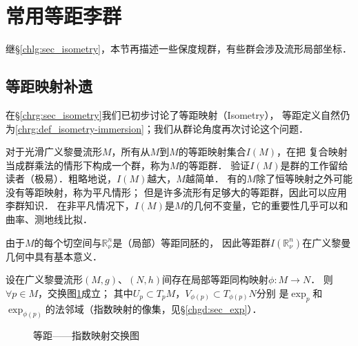 \section{常用等距李群}\label{chlg:sec_matrixG-II}
继\S\ref{chlg:sec_isometry}，本节再描述一些保度规群\cite{tung-1985}，有些群会涉及流形局部坐标．


\subsection{等距映射补遗}\label{chlg:sec_iso-add}
在\S \ref{chrg:sec_isometry}我们已初步讨论了等距映射（Isometry），
等距定义自然仍为\ref{chrg:def_isometry-immersion}；我们从群论角度再次讨论这个问题．


对于光滑广义黎曼流形$M$，所有从$M$到$M$的等距映射集合$I(M)$，在把
复合映射当成群乘法的情形下构成一个群，称为$M$的{\heiti 等距群}．
验证$I(M)$是群的工作留给读者（极易）．粗略地说，$I(M)$越大，$M$越简单．
有的$M$除了恒等映射之外可能没有等距映射，称为平凡情形；
但是许多流形有足够大的等距群，因此可以应用李群知识．
在非平凡情况下，$I(M)$是$M$的几何不变量，它的重要性几乎可以和曲率、测地线比拟．

由于$M$的每个切空间与$\mathbb{R}^n_\nu$是（局部）等距同胚的，
因此等距群$I(\mathbb{R}^n_\nu)$在广义黎曼几何中具有基本意义．

\begin{theorem}\label{chlg:thm_isoexp}
    设在广义黎曼流形$(M,g)$、$(N,h)$间存在局部等距同构映射$\phi:M\to N$．
    则$\forall p\in M$，交换图\ref{chlg:pic_exp-exchange}成立；
    其中$U_p\subset T_pM$，$V_{\phi(p)}\subset T_{\phi(p)}N$分别
    是$\exp_p$和$\exp_{\phi(p)}$的法邻域（指数映射的像集，见\S\ref{chgd:sec_exp}）．
\end{theorem}

\begin{figure}[htb]
    \centering
    \caption{等距——指数映射交换图}\label{chlg:pic_exp-exchange}
\end{figure}

